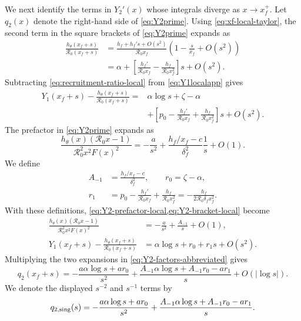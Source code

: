 \documentclass[11pt]{article}
\newcommand{\Rzero}{\mathcal R_0}
\newcommand{\hth}{h_\theta}
\newcommand{\xf}{x_f}
\begin{document}
We next identify the terms in \(Y_2'(x)\) whose integrals diverge as \(x\to\xf^+\). Let \(q_2(x)\) denote the right-hand side of \cref{eq:Y2prime}. Using \cref{eq:xf-local-taylor}, the second term in the square brackets of \cref{eq:Y2prime} expands as
\begin{equation}
\begin{aligned}
\frac{\hth(\xf+s)}{\Rzero(\xf+s)}
&=\frac{h_f+h_f's+O(s^2)}{\Rzero\xf}
\left(1-\frac{s}{\xf}+O(s^2)\right)\\
&=\alpha+\left[\frac{h_f'}{\Rzero\xf}
-\frac{h_f}{\Rzero\xf^2}\right]s+O(s^2).
\end{aligned}
\label{eq:recruitment-ratio-local}
\end{equation}
Subtracting \cref{eq:recruitment-ratio-local} from \cref{eq:Y1localapp} gives
\begin{equation}
\begin{aligned}
Y_1(\xf+s)-\frac{\hth(\xf+s)}{\Rzero(\xf+s)}
={}&\alpha\log s+\zeta-\alpha\\
&+\left[p_0-\frac{h_f'}{\Rzero\xf}+\frac{h_f}{\Rzero\xf^2}\right]s+O(s^2).
\end{aligned}
\label{eq:Y2-bracket-local}
\end{equation}
The prefactor in \cref{eq:Y2prime} expands as
\begin{equation}
\frac{\hth(x)(\Rzero x-1)}{\Rzero^2x^2F(x)^2}
=-\frac{a}{s^2}+\frac{h_f/\xf-c}{\delta_f^2}\frac1s+O(1).
\label{eq:Y2-prefactor-local}
\end{equation}
We define
\begin{equation}
\begin{aligned}
A_{-1}&=\frac{h_f/\xf-c}{\delta_f^2},\qquad r_0=\zeta-\alpha,\\
r_1&=p_0-\frac{h_f'}{\Rzero\xf}+\frac{h_f}{\Rzero\xf^2}
=-\frac{h_f}{2\Rzero\delta_f\xf^2}.
\end{aligned}
\label{eq:ABdefs}
\end{equation}
With these definitions, \cref{eq:Y2-prefactor-local,eq:Y2-bracket-local} become
\begin{equation}
\begin{aligned}
\frac{\hth(x)(\Rzero x-1)}{\Rzero^2x^2F(x)^2}
&=-\frac{a}{s^2}+\frac{A_{-1}}s+O(1),\\
Y_1(\xf+s)-\frac{\hth(\xf+s)}{\Rzero(\xf+s)}
&=\alpha\log s+r_0+r_1s+O(s^2).
\end{aligned}
\label{eq:Y2-factors-abbreviated}
\end{equation}
Multiplying the two expansions in \cref{eq:Y2-factors-abbreviated} gives
\begin{equation}
q_2(\xf+s)=-\frac{a\alpha\log s+ar_0}{s^2}
+\frac{A_{-1}\alpha\log s+A_{-1}r_0-ar_1}{s}+O(|\log s|).
\label{eq:q2-local}
\end{equation}
We denote the displayed \(s^{-2}\) and \(s^{-1}\) terms by
\begin{equation}
q_{2,\rm sing}(s)=-\frac{a\alpha\log s+ar_0}{s^2}
+\frac{A_{-1}\alpha\log s+A_{-1}r_0-ar_1}{s}.
\label{eq:q2sing}
\end{equation}
\end{document}
